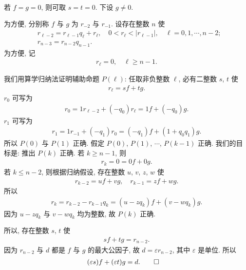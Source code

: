 \begin{pf}
    若 $f=g=0$, 则可取 $s=t=0$. 下设 $g \neq 0$.

    为方便, 分别称 $f$ 与 $g$ 为 $r_{-2}$ 与 $r_{-1}$. 设存在整数 $n$ 使
    \begin{align*}
         & r_{\ell - 2} = r_{\ell - 1} q_{\ell} + r_{\ell}, \quad 0 < r_{\ell} < |r_{\ell - 1}|, \quad \ell = 0,1,\cdots,n-2; \\
         & r_{n - 3} = r_{n - 2} q_{n - 1}.
    \end{align*}
    为方便, 记
    \begin{align*}
        r_{\ell} = 0, \quad \ell \geq n - 1.
    \end{align*}

    我们用算学归纳法证明辅助命题 $P(\ell)$: 任取非负整数 $\ell$, 必有二整数 $s$, $t$ 使
    \begin{align*}
        r_\ell = sf + tg.
    \end{align*}
    $r_0$ 可写为
    \begin{align*}
        r_0 = 1 r_{\ell - 2} + (-q_0) r_{\ell} = 1f + (-q_0)g.
    \end{align*}
    $r_1$ 可写为
    \begin{align*}
        r_1 = 1r_{-1} + (-q_1) r_0 = (-q_1) f + (1 + q_0 q_1) g.
    \end{align*}
    所以 $P(0)$ 与 $P(1)$ 正确. 假定 $P(0)$, $P(1)$, $\cdots$, $P(k-1)$ 正确. 我们的目标是: 推出 $P(k)$ 正确. 若 $k \geq n-1$, 则
    \begin{align*}
        r_k = 0 = 0f + 0g.
    \end{align*}
    若 $k \leq n-2$, 则根据归纳假设, 存在整数 $u$, $v$, $z$, $w$ 使
    \begin{align*}
        r_{k-2} = uf + vg, \quad r_{k-1} = zf + wg.
    \end{align*}
    所以
    \begin{align*}
        r_{k} = r_{k-2} - r_{k-1} q_k = (u - zq_k) f + (v - wq_k) g.
    \end{align*}
    因为 $u - zq_k$ 与 $v - wq_k$ 均为整数, 故 $P(k)$ 正确.

    所以, 存在整数 $s$, $t$ 使
    \begin{align*}
        sf + tg = r_{n-2}.
    \end{align*}
    因为 $r_{n-2}$ 与 $d$ 都是 $f$ 与 $g$ 的最大公因子, 故 $d = \varepsilon r_{n-2}$, 其中 $\varepsilon$ 是单位. 所以
    \begin{align*}
         & (\varepsilon s)f + (\varepsilon t)g = d. \qedhere
    \end{align*}
\end{pf}

